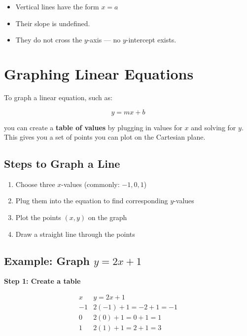 \documentclass[11pt]{article}
\begin{document}
\begin{tcolorbox}[colback=red!5!white, colframe=red!80!black, title=Important Notes on Vertical Lines]
\begin{itemize}
  \item Vertical lines have the form \( x = a \)
  \item Their slope is undefined.
  \item They do not cross the \( y \)-axis — no \( y \)-intercept exists.
\end{itemize}
\end{tcolorbox}
\section{Graphing Linear Equations}

To graph a linear equation, such as:

\[
y = mx + b
\]

you can create a \textbf{table of values} by plugging in values for \( x \) and solving for \( y \). This gives you a set of points you can plot on the Cartesian plane.

\subsection*{Steps to Graph a Line}
\begin{enumerate}
  \item Choose three \( x \)-values (commonly: \( -1, 0, 1 \))
  \item Plug them into the equation to find corresponding \( y \)-values
  \item Plot the points \( (x, y) \) on the graph
  \item Draw a straight line through the points
\end{enumerate}

\subsection*{Example: Graph \( y = 2x + 1 \)}

\textbf{Step 1: Create a table}

\[
\begin{array}{c|c}
x & y = 2x + 1 \\
\hline
-1 & 2(-1) + 1 = -2 + 1 = -1 \\
0 & 2(0) + 1 = 0 + 1 = 1 \\
1 & 2(1) + 1 = 2 + 1 = 3 \\
\end{array}
\]
\end{document}
